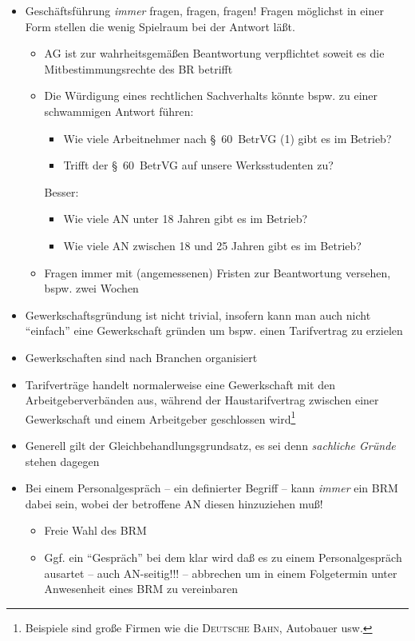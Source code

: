 \documentclass[version=last,paper=A4,fontsize=11pt,DIV=18]{scrartcl}
\begin{document}
\begin{itemize}
	\item Geschäftsführung \emph{immer} fragen, fragen, fragen! Fragen möglichst in einer Form stellen die wenig Spielraum bei der Antwort läßt.
	\begin{itemize}
		\item AG ist zur wahrheitsgemäßen Beantwortung verpflichtet soweit es die Mitbestimmungsrechte des BR betrifft
		\item Die Würdigung eines rechtlichen Sachverhalts könnte bspw. zu einer schwammigen Antwort führen:
		\begin{itemize}
			\item Wie viele Arbeitnehmer nach \S~60~BetrVG (1) gibt es im Betrieb?
			\item Trifft der \S~60~BetrVG auf unsere Werksstudenten zu?
		\end{itemize}
		Besser:
		\begin{itemize}
			\item Wie viele AN unter 18 Jahren gibt es im Betrieb?
			\item Wie viele AN zwischen 18 und 25 Jahren gibt es im Betrieb?
		\end{itemize}
		\item Fragen immer mit (angemessenen) Fristen zur Beantwortung versehen, bspw. zwei Wochen
	\end{itemize}
	\item Gewerkschaftsgründung ist nicht trivial, insofern kann man auch nicht \enquote{einfach} eine Gewerkschaft gründen um bspw. einen Tarifvertrag zu erzielen
	\item Gewerkschaften sind nach Branchen organisiert
	\item Tarifverträge handelt normalerweise eine Gewerkschaft mit den Arbeitgeberverbänden aus, während der Haustarifvertrag zwischen einer Gewerkschaft und einem Arbeitgeber geschlossen wird\footnote{Beispiele sind große Firmen wie die \textsc{Deutsche Bahn}, Autobauer usw.}
	\item Generell gilt der Gleichbehandlungsgrundsatz, es sei denn \emph{sachliche Gründe} stehen dagegen
	\item Bei einem Personalgespräch -- ein definierter Begriff -- kann \emph{immer} ein BRM dabei sein, wobei der betroffene AN diesen hinzuziehen muß!
	\begin{itemize}
		\item Freie Wahl des BRM
		\item Ggf. ein \enquote{Gespräch} bei dem klar wird daß es zu einem Personalgespräch ausartet -- auch AN-seitig!!! -- abbrechen um in einem Folgetermin unter Anwesenheit eines BRM zu vereinbaren

\end{itemize}
\end{itemize}
\end{document}
